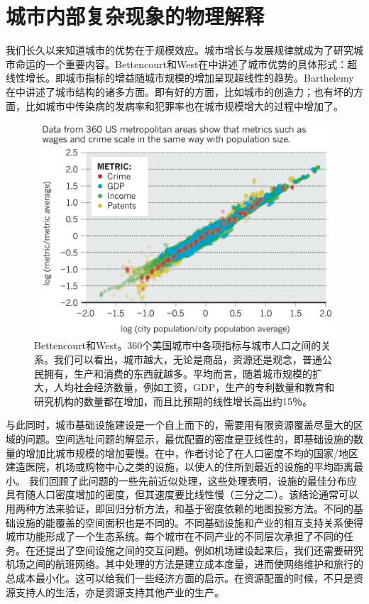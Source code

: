 \chapter{城市内部复杂现象的物理解释}

我们长久以来知道城市的优势在于规模效应。城市增长与发展规律就成为了研究城市命运的一个重要内容\cite{thisse2010toward}。Bettencourt和West在\cite{bettencourt2010unified}中讲述了城市优势的具体形式：超线性增长。即城市指标的增益随城市规模的增加呈现超线性的趋势。Barthelemy在\cite{Barthelemy2019}中讲述了城市结构的诸多方面。即有好的方面，比如城市的创造力\cite{Arbesman2009}；也有坏的方面，比如城市中传染病的发病率\cite{PhysRevE.94.052316}和犯罪率\cite{banerjee2015competitive}也在城市规模增大的过程中增加了。

\begin{figure}
  \centering
  \includegraphics[width = \linewidth]{pictures/scaling.png}
  \caption{Bettencourt和West\cite{bettencourt2010unified}。360个美国城市中各项指标与城市人口之间的关系。我们可以看出，城市越大，无论是商品，资源还是观念，普通公民拥有，生产和消费的东西就越多。平均而言，随着城市规模的扩大，人均社会经济数量，例如工资，GDP，生产的专利数量和教育和研究机构的数量都在增加，而且比预期的线性增长高出约15％。}
\end{figure}

与此同时，城市基础设施建设是一个自上而下的，需要用有限资源覆盖尽量大的区域的问题\cite{PhysRevE.90.022803,PhysRevE.74.016117}。空间选址问题的解显示，最优配置的密度是亚线性的，即基础设施的数量的增加比城市规模的增加要慢。在\cite{PhysRevE.74.016117}中，作者讨论了在人口密度不均的国家/地区建造医院，机场或购物中心之类的设施，以使人的住所到最近的设施的平均距离最小。 我们回顾了此问题的一些先前近似处理，这些处理表明，设施的最佳分布应具有随人口密度增加的密度，但其速度要比线性慢（三分之二）。该结论通常可以用两种方法来验证，即回归分析方法，和基于密度依赖的地图投影方法。不同的基础设施的能覆盖的空间面积也是不同的。不同基础设施和产业的相互支持关系使得城市功能形成了一个生态系统。每个城市在不同产业的不同层次承担了不同的任务\cite{camagni1993city,christopherson1986city}。在\cite{PhysRevE.74.016117}还提出了空间设施之间的交互问题。例如机场建设起来后，我们还需要研究机场之间的航班网络。其中处理的方法是建立成本度量，进而使网络维护和旅行的总成本最小化。这可以给我们一些经济方面的启示。在资源配置的时候，不只是资源支持人的生活，亦是资源支持其他产业的生产。

